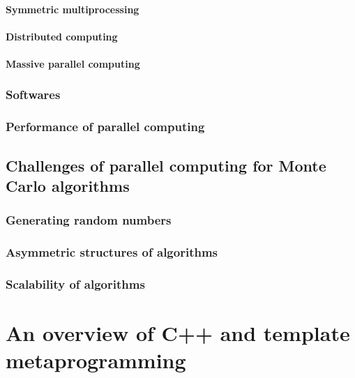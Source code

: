 \paragraph{Symmetric multiprocessing}

\paragraph{Distributed computing}

\paragraph{Massive parallel computing}

\subsubsection{Softwares}
\label{ssub:Softwares}

\subsubsection{Performance of parallel computing}
\label{ssub:Performance of parallel computing}

\subsection{Challenges of parallel computing for Monte Carlo algorithms}
\label{sub:Challenges of parallel computing for Monte Carlo algorithms}

\subsubsection{Generating random numbers}
\label{ssub:Generating random numbers}

\subsubsection{Asymmetric structures of algorithms}
\label{ssub:Asymmetric structures of algorithms}

\subsubsection{Scalability of algorithms}
\label{ssub:Scalability of algorithms}

\section{An overview of C++ and template metaprogramming}
\label{sec:An overview of C++ and template metaprogramming}

